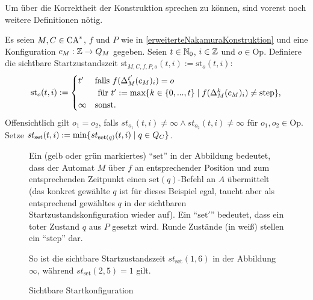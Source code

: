 Um über die Korrektheit der Konstruktion sprechen zu können, sind vorerst noch weitere Definitionen nötig.

\begin{definition}
    Es seien $M, C \in \textrm{CA}^*$, $f$ und $P$ wie in \cref{erweiterteNakamuraKonstruktion} und eine Konfiguration $c_M: \mathbb{Z} \to Q_M$ gegeben.
    Seien $t \in \mathbb{N}_0$, $i \in \mathbb{Z}$ und $o \in \mathrm{Op}$.
    Definiere die sichtbare Startzustandszeit $\mathrm{st}_{M, C, f, P, o}(t, i) := \mathrm{st}_o(t, i)$:
    \[
        \mathrm{st}_o(t, i) :=
        \begin{cases}
            t' &
                \text{falls } f(\Delta_M^{t'}(c_M)_i) = o \\
                & \text{ für } t' := \max \{ { k \in \{ {0, ..., t} \} } \; | \; { f(\Delta_M^{k}(c_M)_i) \neq \mathrm{step} } \},
            \\
            \infty & \text{sonst.}
        \end{cases}
    \]
    Offensichtlich gilt $o_1 = o_2$, falls $st_{o_1}(t, i) \neq \infty \land st_{o_2}(t, i) \neq \infty$ für $o_1, o_2 \in \mathrm{Op}$.
    Setze $st_{\mathrm{set}}(t, i) := \min \{ { st_{\mathrm{set}(q)}(t, i)} \; | \; { q \in Q_C } \}$.
    
    \newcommand{\setq}{\scriptsize $\mathrm{set}$}
    \newcommand{\setp}{\scriptsize $\mathrm{set}'$}
    
    \begin{figure}[h!]
        \begin{center}
        
        \end{center}
        \caption{Sichtbare Startkonfiguration}
        \label{fig:SichtbareStartkonfiguration}
        
        Ein (gelb oder grün markiertes) \enquote{$\mathrm{set}$} in der Abbildung bedeutet,
        dass der Automat $M$ über $f$ an entsprechender Position und zum entsprechenden Zeitpunkt
        einen $\mathrm{set}(q)$-Befehl an $A$ übermittelt (das konkret gewählte $q$ ist für dieses Beispiel egal, taucht aber als entsprechend gewähltes $q$ in der sichtbaren Startzustandskonfiguration wieder auf).
        Ein \enquote{$\mathrm{set}'$} bedeutet, dass ein toter Zustand $q$ aus $P$ gesetzt wird.
        Runde Zustände (in weiß) stellen ein \enquote{$\mathrm{step}$} dar.
        
        So ist die sichtbare Startzustandszeit $st_{\mathrm{set}}(1, 6)$ in der Abbildung $\infty$,
        während $st_{\mathrm{set}}(2, 5) = 1$ gilt.
        

\end{figure}
\end{definition}
